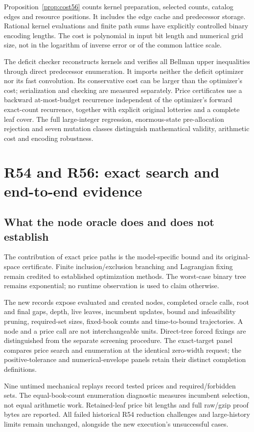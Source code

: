 Proposition~\ref{prop:cost56} counts kernel preparation, selected counts, catalog edges and resource positions. It includes the edge cache and predecessor storage. Rational kernel evaluations and finite path sums have explicitly controlled binary encoding lengths. The cost is polynomial in input bit length and numerical grid size, not in the logarithm of inverse error or of the common lattice scale.

The deficit checker reconstructs kernels and verifies all Bellman upper inequalities through direct predecessor enumeration. It imports neither the deficit optimizer nor its fast convolution. Its conservative cost can be larger than the optimizer's cost; serialization and checking are measured separately. Price certificates use a backward at-most-budget recurrence independent of the optimizer's forward exact-count recurrence, together with explicit original lotteries and a complete leaf cover. The full large-integer regression, enormous-state pre-allocation rejection and seven mutation classes distinguish mathematical validity, arithmetic cost and encoding robustness.

\section{R54 and R56: exact search and end-to-end evidence}
\subsection{What the node oracle does and does not establish}
The contribution of exact price paths is the model-specific bound and its original-space certificate. Finite inclusion/exclusion branching and Lagrangian fixing remain credited to established optimization methods. The worst-case binary tree remains exponential; no runtime observation is used to claim otherwise.

The new records expose evaluated and created nodes, completed oracle calls, root and final gaps, depth, live leaves, incumbent updates, bound and infeasibility pruning, required-set sizes, fixed-book counts and time-to-bound trajectories. A node and a price call are not interchangeable units. Direct-tree forced fixings are distinguished from the separate screening procedure. The exact-target panel compares price search and enumeration at the identical zero-width request; the positive-tolerance and numerical-envelope panels retain their distinct completion definitions.

Nine untimed mechanical replays record tested prices and required/forbidden sets. The equal-book-count enumeration diagnostic measures incumbent selection, not equal arithmetic work. Retained-leaf price bit lengths and full raw/gzip proof bytes are reported. All failed historical R54 reduction challenges and large-history limits remain unchanged, alongside the new execution's unsuccessful cases.

